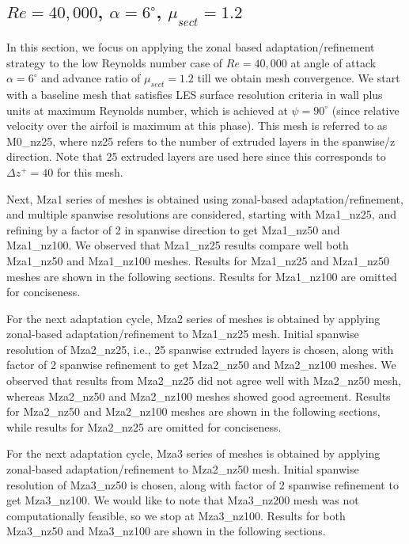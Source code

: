 \subsection{ $Re=40,000$,  $\alpha=6^\circ$, $\mu_{sect}=1.2$}

In this section, we focus on applying the zonal based adaptation/refinement strategy to the low Reynolds number case of $Re=40,000$ at angle of attack $\alpha=6^\circ$ and advance ratio of $\mu_{sect}=1.2$ till we obtain mesh convergence.
We start with a baseline mesh that satisfies LES surface resolution criteria in wall plus units at maximum Reynolds number, which is achieved at $\psi=90^\circ$ (since relative velocity over the airfoil is maximum at this phase). 
This mesh is referred to as M0\_nz25, where nz25 refers to the number of extruded layers in the spanwise/z direction. Note that 25 extruded layers are used here since this corresponds to $\Delta z^+ = 40$ for this mesh.

Next, Mza1 series of meshes is obtained using zonal-based adaptation/refinement, and multiple spanwise resolutions are considered, starting with Mza1\_nz25, and refining by a factor of 2 in spanwise direction to get Mza1\_nz50 and Mza1\_nz100.
We observed that Mza1\_nz25 results compare well both Mza1\_nz50 and Mza1\_nz100 meshes.
Results for Mza1\_nz25 and Mza1\_nz50 meshes are shown in the following sections.
Results for Mza1\_nz100 are omitted for conciseness.

For the next adaptation cycle, Mza2 series of meshes is obtained by applying  zonal-based adaptation/refinement to Mza1\_nz25 mesh.
Initial spanwise resolution of Mza2\_nz25, i.e., 25 spanwise extruded layers is chosen, along with factor of 2 spanwise refinement to get Mza2\_nz50 and Mza2\_nz100 meshes. 
We observed that results from Mza2\_nz25 did not agree well with Mza2\_nz50 mesh, whereas Mza2\_nz50 and Mza2\_nz100 meshes showed good agreement.
Results for Mza2\_nz50 and Mza2\_nz100 meshes are shown in the following sections, while results for Mza2\_nz25 are omitted for conciseness.

For the next adaptation cycle, Mza3 series of meshes is obtained by applying  zonal-based adaptation/refinement to Mza2\_nz50 mesh. 
Initial spanwise resolution of Mza3\_nz50 is chosen, along with factor of 2 spanwise refinement to get Mza3\_nz100. 
We would like to note that Mza3\_nz200 mesh was not computationally feasible, so we stop at Mza3\_nz100.
Results for both Mza3\_nz50 and Mza3\_nz100 are shown in the following sections.

